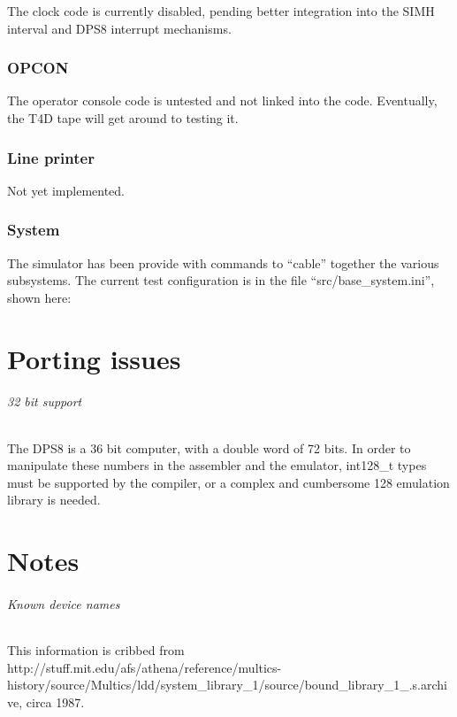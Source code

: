 \documentclass[notitlepage]{report}
\begin{document}
The clock code is currently disabled, pending better integration into the SIMH interval and DPS8 interrupt mechanisms.

\section {OPCON}

The operator console code is untested and not linked into the code. Eventually, the T4D tape will get around to testing it.

\section {Line printer}

Not yet implemented.

\section {System}

The simulator has been provide with commands to ``cable'' together the various subsystems. The current test configuration is in the file ``src/base\_system.ini'', shown here:





\part {Porting issues}

\paragraph {32 bit support}

The DPS8 is a 36 bit computer, with a double word of 72 bits. In order to 
manipulate these numbers in the assembler and the emulator, int128\_t 
types must be supported by the compiler, or a complex and cumbersome 128 
emulation library is needed.

\part {Notes}

\paragraph {Known device names}

This information is cribbed from 
http://stuff.mit.edu/afs/athena/reference/multics-history/source/Multics/ldd/system\_library\_1/source/bound\_library\_1\_.s.archive,
circa 1987.
\end{document}
